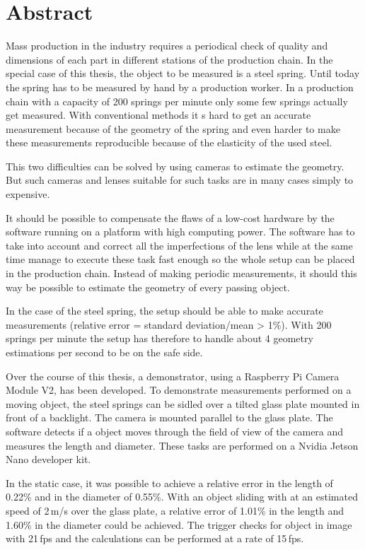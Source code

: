 \chapter*{Abstract}

Mass production in the industry requires a periodical check of quality and dimensions of each part in different stations of the production chain.
In the special case of this thesis, the object to be measured is a steel spring.
Until today the spring has to be measured by hand by a production worker. In a production chain with a capacity of 200 springs per minute only some few springs actually get measured.
With conventional methods it s hard to get an accurate measurement because of the geometry of the spring and even harder to make these measurements reproducible because of the elasticity of the used steel.

This two difficulties can be solved by using cameras to estimate the geometry.
But such cameras and lenses suitable for such tasks are in many cases simply to expensive.

It should be possible to compensate the flaws of a low-cost hardware by the software running on a platform with high computing power.
The software has to take into account and correct all the imperfections of the lens while at the same time manage to execute these task fast enough so the whole setup can be placed in the production chain.
Instead of making periodic measurements, it should this way be possible to estimate the geometry of every passing object.

In the case of the steel spring, the setup should be able to make accurate measurements (relative error = standard deviation/mean > 1\%).
With 200 springs per minute the setup has therefore to handle about 4 geometry estimations per second to be on the safe side.

Over the course of this thesis, a demonstrator, using a Raspberry Pi Camera Module V2, has been developed.
To demonstrate measurements performed on a moving object, the steel springs can be sidled over a tilted glass plate mounted in front of a backlight.
The camera is mounted parallel to the glass plate.
The software detects if a object moves through the field of view of the camera and measures the length and diameter.
These tasks are performed on a Nvidia Jetson Nano developer kit.

In the static case, it was possible to achieve a relative error in the length of 0.22\% and in the diameter of 0.55\%.
With an object sliding with at an estimated speed of 2\,m/s over the glass plate, a relative error of 1.01\% in the length and 1.60\% in the diameter could be achieved.
The trigger checks for object in image with 21\,fps and the calculations can be performed at a rate of 15\,fps. 
